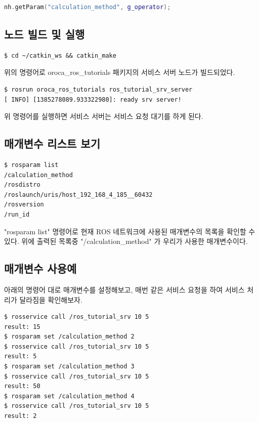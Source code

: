 \begin{lstlisting}[language=C++]
nh.getParam("calculation_method", g_operator);
\end{lstlisting}

\subsection{노드 빌드 및 실행}

\begin{lstlisting}[language=ROS]
$ cd ~/catkin_ws && catkin_make
\end{lstlisting}

위의 명령어로 oroca\_ros\_tutorials 패키지의 서비스 서버 노드가 빌드되었다. 

\begin{lstlisting}[language=ROS]
$ rosrun oroca_ros_tutorials ros_tutorial_srv_server 
[ INFO] [1385278089.933322980]: ready srv server!
\end{lstlisting}

위 명령어를 실행하면 서비스 서버는 서비스 요청 대기를 하게 된다.

\subsection{매개변수 리스트 보기}

\begin{lstlisting}[language=ROS]
$ rosparam list
/calculation_method
/rosdistro
/roslaunch/uris/host_192_168_4_185__60432
/rosversion
/run_id
\end{lstlisting}

"rosparam list" 명령어로 현재 ROS 네트워크에 사용된 매개변수의 목록을 확인할 수 있다. 위에 출력된 목록중 "/calculation\_method" 가 우리가 사용한 매개변수이다.

\subsection{매개변수 사용예}

아래의 명령어 대로 매개변수를 설정해보고, 매번 같은 서비스 요청을 하여 서비스 처리가 달라짐을 확인해보자.

\begin{lstlisting}[language=ROS]
$ rosservice call /ros_tutorial_srv 10 5
result: 15
$ rosparam set /calculation_method 2
$ rosservice call /ros_tutorial_srv 10 5
result: 5
$ rosparam set /calculation_method 3
$ rosservice call /ros_tutorial_srv 10 5
result: 50
$ rosparam set /calculation_method 4
$ rosservice call /ros_tutorial_srv 10 5
result: 2 
\end{lstlisting}

